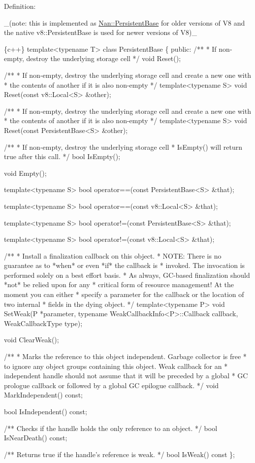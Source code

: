Definition\+:

\+\_\+(note\+: this is implemented as {\ttfamily \hyperlink{class_nan_1_1_persistent_base}{Nan\+::\+Persistent\+Base}} for older versions of V8 and the native {\ttfamily v8\+::\+Persistent\+Base} is used for newer versions of V8)\+\_\+


\begin{DoxyCode}
\{c++\}
template<typename T> class PersistentBase \{
 public:
  /**
   * If non-empty, destroy the underlying storage cell
   */
  void Reset();

  /**
   * If non-empty, destroy the underlying storage cell and create a new one with
   * the contents of another if it is also non-empty
   */
  template<typename S> void Reset(const v8::Local<S> &other);

  /**
   * If non-empty, destroy the underlying storage cell and create a new one with
   * the contents of another if it is also non-empty
   */
  template<typename S> void Reset(const PersistentBase<S> &other);

  /**
   * If non-empty, destroy the underlying storage cell
   * IsEmpty() will return true after this call.
   */
  bool IsEmpty();

  void Empty();

  template<typename S> bool operator==(const PersistentBase<S> &that);

  template<typename S> bool operator==(const v8::Local<S> &that);

  template<typename S> bool operator!=(const PersistentBase<S> &that);

  template<typename S> bool operator!=(const v8::Local<S> &that);

   /**
   *  Install a finalization callback on this object.
   *  NOTE: There is no guarantee as to *when* or even *if* the callback is
   *  invoked. The invocation is performed solely on a best effort basis.
   *  As always, GC-based finalization should *not* be relied upon for any
   *  critical form of resource management! At the moment you can either
   *  specify a parameter for the callback or the location of two internal
   *  fields in the dying object.
   */
  template<typename P>
  void SetWeak(P *parameter,
               typename WeakCallbackInfo<P>::Callback callback,
               WeakCallbackType type);

  void ClearWeak();

  /**
   * Marks the reference to this object independent. Garbage collector is free
   * to ignore any object groups containing this object. Weak callback for an
   * independent handle should not assume that it will be preceded by a global
   * GC prologue callback or followed by a global GC epilogue callback.
   */
  void MarkIndependent() const;

  bool IsIndependent() const;

  /** Checks if the handle holds the only reference to an object. */
  bool IsNearDeath() const;

  /** Returns true if the handle's reference is weak.  */
  bool IsWeak() const
\};
\end{DoxyCode}



